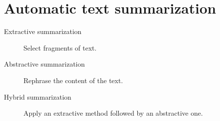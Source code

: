 \chapter{Automatic text summarization}

\begin{description}
    \item[Extractive summarization] 
        Select fragments of text.

    \item[Abstractive summarization] 
        Rephrase the content of the text.

    \item[Hybrid summarization] 
        Apply an extractive method followed by an abstractive one.
\end{description}


